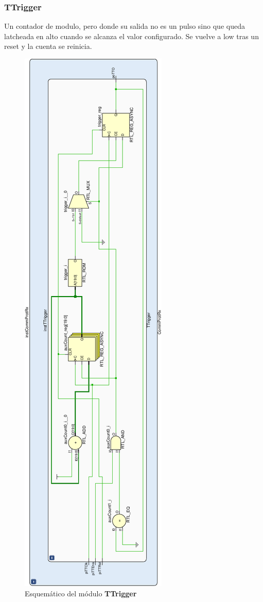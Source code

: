 \documentclass[12pt]{article}
\begin{document}
\subsubsection{TTrigger}
Un contador de modulo, pero donde su salida no es un pulso sino que queda latcheada en alto cuando se alcanza el valor configurado. Se vuelve a low tras un reset y la cuenta se reinicia.

\begin{figure}[H]
    \centering
    \includegraphics[angle=270, width=\textwidth]{ttrigger-crop}
    \caption{Esquemático del módulo \textbf{TTrigger}}
\end{figure}
\end{document}
